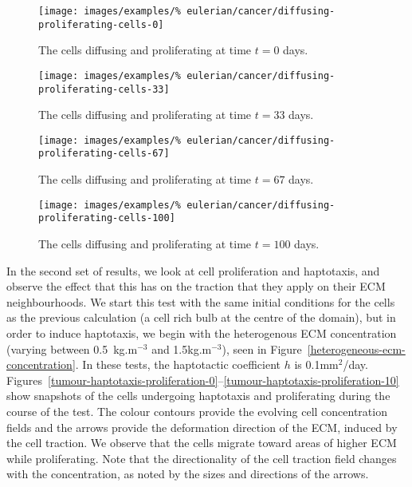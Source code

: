 \clearpage

\begin{figure}[!hptb]
\centering
\texttt{[image: images/examples/\%
eulerian/cancer/diffusing-proliferating-cells-0]}
\caption{The cells diffusing and proliferating at time $t=0$ days.}
\label{tumour-diffusion-proliferation-0}
\end{figure}

\begin{figure}[!hptb]
\centering
\texttt{[image: images/examples/\%
eulerian/cancer/diffusing-proliferating-cells-33]}
\caption{The cells diffusing and proliferating at time $t=33$ days.}
\label{tumour-diffusion-proliferation-33}
\end{figure}

\begin{figure}[!hptb]
\centering
\texttt{[image: images/examples/\%
eulerian/cancer/diffusing-proliferating-cells-67]}
\caption{The cells diffusing and proliferating at time $t=67$ days.}
\label{tumour-diffusion-proliferation-67}
\end{figure}

\begin{figure}[!hptb]
\centering
\texttt{[image: images/examples/\%
eulerian/cancer/diffusing-proliferating-cells-100]}
\caption{The cells diffusing and proliferating at time $t=100$ days.}
\label{tumour-diffusion-proliferation-100}
\end{figure}

\clearpage

In the second set of results, we look at cell proliferation and
haptotaxis, and observe the effect that this has on the traction that
they apply on their ECM neighbourhoods. We start this test with the
same initial conditions for the cells as the previous calculation (a
cell rich bulb at the centre of the domain), but in order to induce
haptotaxis, we begin with the heterogenous ECM concentration (varying
between 0.5~kg.m$^{-3}$ and 1.5kg.m$^{-3}$), seen in
Figure~\ref{heterogeneous-ecm-concentration}. In these tests, the
haptotactic coefficient $h$ is 0.1mm$^2$/day.  Figures~\ref{tumour-haptotaxis-proliferation-0}--\ref{tumour-haptotaxis-proliferation-10}
show snapshots of the cells undergoing haptotaxis and proliferating
during the course of the test. The colour
contours provide the evolving cell concentration fields and the arrows
provide the deformation direction of the ECM, induced by the cell
traction. We observe that the cells migrate toward areas of higher ECM
while proliferating. Note that the directionality of the cell traction field
changes with the concentration, as noted by the sizes and directions
of the arrows.

